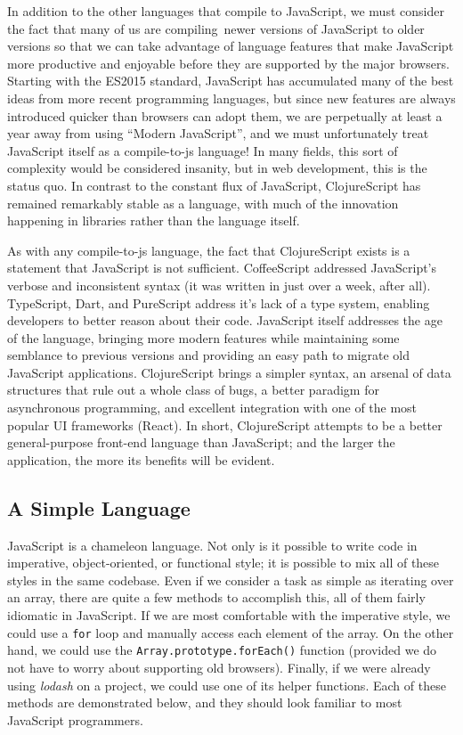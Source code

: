 \documentclass[10pt,twoside,openright]{memoir}
\begin{document}
In addition to the other languages that compile to JavaScript, we must
consider the fact that many of us are compiling~newer versions of
JavaScript to older versions so that we can take advantage of language
features that make JavaScript more productive and enjoyable before they
are supported by the major browsers. Starting with the ES2015 standard,
JavaScript has accumulated many of the best ideas from more recent
programming languages, but since new features are always introduced
quicker than browsers can adopt them, we are perpetually at least a year
away from using ``Modern JavaScript'', and we must unfortunately treat
JavaScript itself as a compile-to-js language! In many fields, this sort
of complexity would be considered insanity, but in web development, this
is the status quo. In contrast to the constant flux of JavaScript,
ClojureScript has remained remarkably stable as a language, with much of
the innovation happening in libraries rather than the language itself.

As with any compile-to-js language, the fact that ClojureScript exists
is a statement that JavaScript is not sufficient. CoffeeScript addressed
JavaScript's verbose and inconsistent syntax (it was written in just
over a week, after all). TypeScript, Dart, and PureScript address it's
lack of a type system, enabling developers to better reason about their
code. JavaScript itself addresses the age of the language, bringing more
modern features while maintaining some semblance to previous versions
and providing an easy path to migrate old JavaScript applications.
ClojureScript brings a simpler syntax, an arsenal of data structures
that rule out a whole class of bugs, a better paradigm for asynchronous
programming, and excellent integration with one of the most popular UI
frameworks (React). In short, ClojureScript attempts to be a better
general-purpose front-end language than JavaScript; and the larger the
application, the more its benefits will be evident.

\subsection{A Simple Language}

JavaScript is a chameleon language. Not only is it possible to write
code in imperative, object-oriented, or functional style; it is possible
to mix all of these styles in the same codebase. Even if we consider a
task as simple as iterating over an array, there are quite a few methods
to accomplish this, all of them fairly idiomatic in JavaScript. If we
are most comfortable with the imperative style, we could use a
\texttt{for} loop and manually access each element of the array. On the
other hand, we could use the \texttt{Array.prototype.forEach()} function
(provided we do not have to worry about supporting old browsers).
Finally, if we were already using \emph{lodash} on a project, we could
use one of its helper functions. Each of these methods are demonstrated
below, and they should look familiar to most JavaScript programmers.
\end{document}

